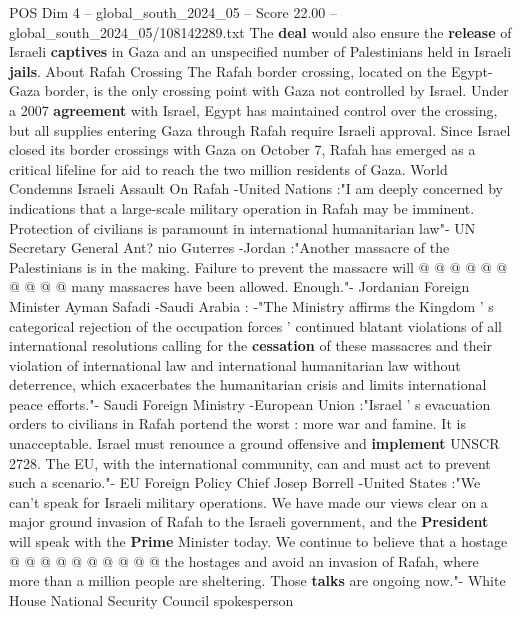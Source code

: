 \begin{textsample}{POS Dim 4 – global\_south\_2024\_05 – Score 22.00 – global\_south\_2024\_05/108142289.txt}
The \textbf{deal} would also ensure the \textbf{release} of Israeli \textbf{captives} in Gaza and an unspecified number of Palestinians held in Israeli \textbf{jails}.
About Rafah Crossing The Rafah border crossing, located on the Egypt-Gaza border, is the only crossing point with Gaza not controlled by Israel.
Under a 2007 \textbf{agreement} with Israel, Egypt has maintained control over the crossing, but all supplies entering Gaza through Rafah require Israeli approval.
Since Israel closed its border crossings with Gaza on October 7, Rafah has emerged as a critical lifeline for aid to reach the two million residents of Gaza.
World Condemns Israeli Assault On Rafah -United Nations :"I am deeply concerned by indications that a large-scale military operation in Rafah may be imminent.
Protection of civilians is paramount in international humanitarian law"- UN Secretary General Ant? nio Guterres -Jordan :"Another massacre of the Palestinians is in the making.
Failure to prevent the massacre will @ @ @ @ @ @ @ @ @ @ many massacres have been allowed.
Enough."- Jordanian Foreign Minister Ayman Safadi -Saudi Arabia : -"The Ministry affirms the Kingdom ' s categorical rejection of the occupation forces ' continued blatant violations of all international resolutions calling for the \textbf{cessation} of these massacres and their violation of international law and international humanitarian law without deterrence, which exacerbates the humanitarian crisis and limits international peace efforts."- Saudi Foreign Ministry -European Union :"Israel ' s evacuation orders to civilians in Rafah portend the worst : more war and famine.
It is unacceptable.
Israel must renounce a ground offensive and \textbf{implement} UNSCR 2728.
The EU, with the international community, can and must act to prevent such a scenario."- EU Foreign Policy Chief Josep Borrell -United States :"We can't speak for Israeli military operations.
We have made our views clear on a major ground invasion of Rafah to the Israeli government, and the \textbf{President} will speak with the \textbf{Prime} Minister today.
We continue to believe that a hostage @ @ @ @ @ @ @ @ @ @ the hostages and avoid an invasion of Rafah, where more than a million people are sheltering.
Those \textbf{talks} are ongoing now."- White House National Security Council spokesperson

\end{textsample}
